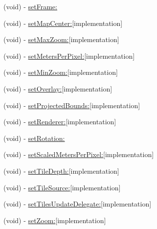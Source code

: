 \begin{DoxyCompactItemize}
\item 
(void) -\/ \hyperlink{interface_r_m_map_contents_a8bb51badbffed49e25be29edafb10a95}{set\-Frame\-:}
\item 
(void) -\/ \hyperlink{interface_r_m_map_contents_a7787b10ca141e7fdaf6e99312d4f5504}{set\-Map\-Center\-:}{\ttfamily  \mbox{[}implementation\mbox{]}}
\item 
(void) -\/ \hyperlink{interface_r_m_map_contents_a2668247ea9686a5d84aff8db823b1cf6}{set\-Max\-Zoom\-:}{\ttfamily  \mbox{[}implementation\mbox{]}}
\item 
(void) -\/ \hyperlink{interface_r_m_map_contents_a56e7ec20e0ef55c9bdceb73dee05a1aa}{set\-Meters\-Per\-Pixel\-:}{\ttfamily  \mbox{[}implementation\mbox{]}}
\item 
(void) -\/ \hyperlink{interface_r_m_map_contents_a5c2eda436f8e54cbed7263e419046cd1}{set\-Min\-Zoom\-:}{\ttfamily  \mbox{[}implementation\mbox{]}}
\item 
(void) -\/ \hyperlink{interface_r_m_map_contents_ad20f344bc5c5361cc12a08bb1221f766}{set\-Overlay\-:}{\ttfamily  \mbox{[}implementation\mbox{]}}
\item 
(void) -\/ \hyperlink{interface_r_m_map_contents_ad94e75ab1195d755f8f52caba2fc554f}{set\-Projected\-Bounds\-:}{\ttfamily  \mbox{[}implementation\mbox{]}}
\item 
(void) -\/ \hyperlink{interface_r_m_map_contents_ab3dc71cf707383671723a0629bbf6587}{set\-Renderer\-:}{\ttfamily  \mbox{[}implementation\mbox{]}}
\item 
(void) -\/ \hyperlink{interface_r_m_map_contents_a8c9d36abec740f7a9c7047fa1f47daa5}{set\-Rotation\-:}
\item 
(void) -\/ \hyperlink{interface_r_m_map_contents_a9de0ef8146a2ec46e7bca53bbd763bec}{set\-Scaled\-Meters\-Per\-Pixel\-:}{\ttfamily  \mbox{[}implementation\mbox{]}}
\item 
(void) -\/ \hyperlink{interface_r_m_map_contents_ae33000c5144c046f9d4da1d20b80004c}{set\-Tile\-Depth\-:}{\ttfamily  \mbox{[}implementation\mbox{]}}
\item 
(void) -\/ \hyperlink{interface_r_m_map_contents_a69a041eb8065efe8f31ce40ad9894f1c}{set\-Tile\-Source\-:}{\ttfamily  \mbox{[}implementation\mbox{]}}
\item 
(void) -\/ \hyperlink{interface_r_m_map_contents_afbdfe65940239191436f23b14942bb2e}{set\-Tiles\-Update\-Delegate\-:}{\ttfamily  \mbox{[}implementation\mbox{]}}
\item 
(void) -\/ \hyperlink{interface_r_m_map_contents_a06f80b8cd231adf996ed5c363afa34f8}{set\-Zoom\-:}{\ttfamily  \mbox{[}implementation\mbox{]}}

\end{DoxyCompactItemize}
